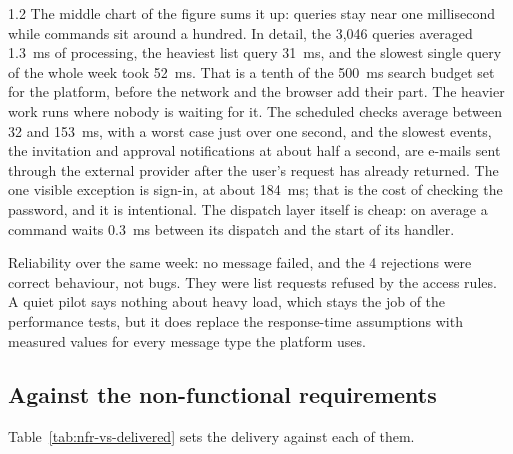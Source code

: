 \begin{spacing}{1.2}
The middle chart of the figure sums it up: queries stay near one
millisecond while commands sit around a hundred. In detail, the
3{,}046 queries averaged 1.3~ms of processing, the heaviest list
query 31~ms, and the slowest single query of the whole week took
52~ms. That is a tenth of the 500~ms search budget set for the platform,
before the network and the browser add their part. The heavier work runs where nobody is waiting for it. The
scheduled checks average between 32 and 153~ms, with a worst case
just over one second, and the slowest events, the invitation and
approval notifications at about half a second, are e-mails sent
through the external provider after the user's request has already
returned. The one visible exception is sign-in, at about 184~ms; that
is the cost of checking the password, and it is intentional. The
dispatch layer itself is cheap: on average a command waits 0.3~ms
between its dispatch and the start of its handler.

Reliability over the same week: no message failed, and the 4
rejections were correct behaviour, not bugs. They were list requests refused by the access rules. A
quiet pilot says nothing about heavy load, which stays the job of the
performance tests, but it does replace the response-time assumptions
with measured values for every message type the platform uses.

\subsection{Against the non-functional requirements}
\label{sec:nfr-review}

Table~\ref{tab:nfr-vs-delivered} sets the delivery against each of them.


\end{spacing}
